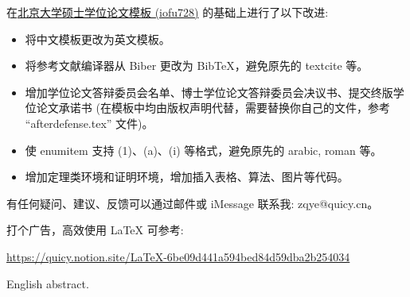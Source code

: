 \begin{cabstract}
    在\href{https://www.overleaf.com/latex/templates/2021-peking-university-master-thesis-template-iofu728-pkuthss/rwfvbkpzydpf}{北京大学硕士学位论文模板 (iofu728)} 的基础上进行了以下改进:
    \begin{itemize}
        \item 将中文模板更改为英文模板。
        \item 将参考文献编译器从 Biber 更改为 BibTeX，避免原先的 textcite 等。
        \item 增加学位论文答辩委员会名单、博士学位论文答辩委员会决议书、提交终版学位论文承诺书 (在模板中均由版权声明代替，需要替换你自己的文件，参考 ``afterdefense.tex'' 文件)。
        \item 使 enumitem 支持 (1)、(a)、(i) 等格式，避免原先的 arabic, roman 等。
        \item 增加定理类环境和证明环境，增加插入表格、算法、图片等代码。
    \end{itemize}

    \bigskip

    有任何疑问、建议、反馈可以通过邮件或 iMessage 联系我: zqye@quicy.cn。
    
    \bigskip
    
    打个广告，高效使用 LaTeX 可参考:

    \url{https://quicy.notion.site/LaTeX-6be09d441a594bed84d59dba2b254034}


\end{cabstract}

\begin{eabstract}
English abstract.
\end{eabstract}